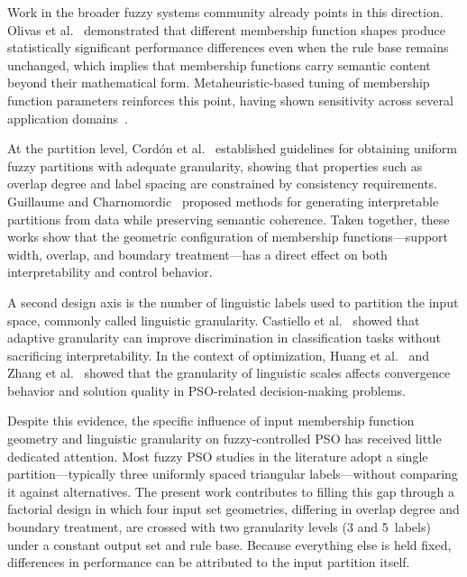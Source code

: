 \documentclass[conference]{IEEEtran}
\begin{document}
Work in the broader fuzzy systems community already points in this direction. Olivas et al.~\cite{olivas2014comparative} demonstrated that different membership function shapes produce statistically significant performance differences even when the rule base remains unchanged, which implies that membership functions carry semantic content beyond their mathematical form. Metaheuristic-based tuning of membership function parameters reinforces this point, having shown sensitivity across several application domains~\cite{fierro2013optimization, nikolic2020bee}.

At the partition level, Cord\'on et al.~\cite{cordon2000uniform} established guidelines for obtaining uniform fuzzy partitions with adequate granularity, showing that properties such as overlap degree and label spacing are constrained by consistency requirements. Guillaume and Charnomordic~\cite{guillaume2004interpretable} proposed methods for generating interpretable partitions from data while preserving semantic coherence. Taken together, these works show that the geometric configuration of membership functions---support width, overlap, and boundary treatment---has a direct effect on both interpretability and control behavior.

A second design axis is the number of linguistic labels used to partition the input space, commonly called linguistic granularity. Castiello et al.~\cite{castiello2019interpretable} showed that adaptive granularity can improve discrimination in classification tasks without sacrificing interpretability. In the context of optimization, Huang et al.~\cite{huang2022linguistic} and Zhang et al.~\cite{zhang2022linguistic} showed that the granularity of linguistic scales affects convergence behavior and solution quality in PSO-related decision-making problems.

Despite this evidence, the specific influence of input membership function geometry and linguistic granularity on fuzzy-controlled PSO has received little dedicated attention. Most fuzzy PSO studies in the literature adopt a single partition---typically three uniformly spaced triangular labels---without comparing it against alternatives. The present work contributes to filling this gap through a factorial design in which four input set geometries, differing in overlap degree and boundary treatment, are crossed with two granularity levels (3 and 5~labels) under a constant output set and rule base. Because everything else is held fixed, differences in performance can be attributed to the input partition itself.
\end{document}
